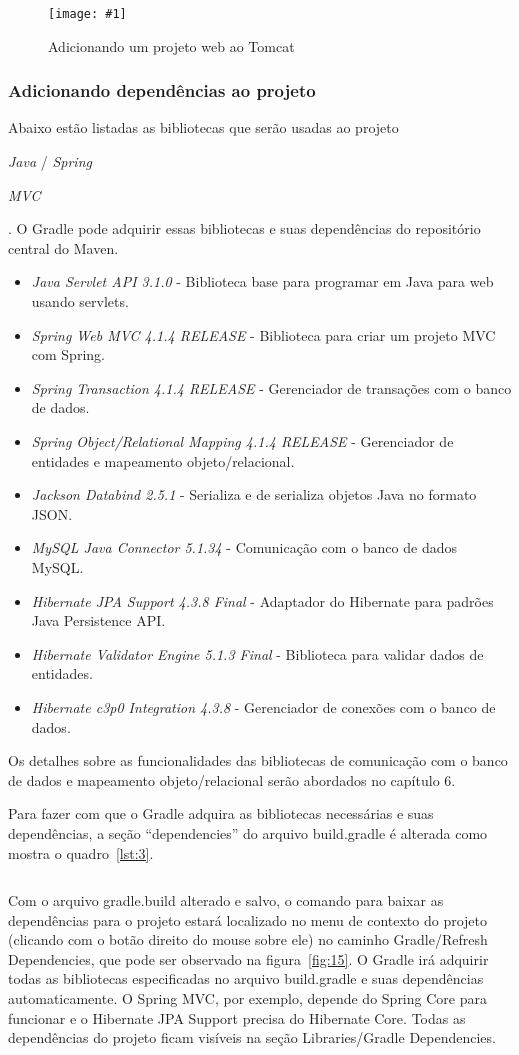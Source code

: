 \documentclass[a4paper,12pt]{article}
\newenvironment{simple}%
{\noindent}%
{\par\noindent}
\newcommand{\spring} {
	\lang{Java}/\est{Spring} \sigla{MVC}
}
\newcommand{\figura}[3] {
	\begin{figure}[H]
		\centering
		\texttt{[image: \#1]}
		\caption{#2}
		\label{#3}
	\end{figure}
	\FloatBarrier
}
\newcommand{\est}[1] {
	\textit{#1}
}
\newcommand{\sigla}[1] {
	\textit{#1}
}
\newcommand{\lang}[1] {
	\textit{#1}
}
\newcommand{\lib}[1] {
	\textit{#1}
}
\newcommand{\groovycode}[3] {
	\begin{simple}
	\inputminted[fontsize=\footnotesize]{groovy}{#1}
	\captionof{listing}{#2}
	\label{#3}
	\end{simple}
	\FloatBarrier
}
\begin{document}
\figura{tomcatproject.png}{Adicionando um projeto web ao Tomcat}{fig:14}

\subsubsection{Adicionando dependências ao projeto}

Abaixo estão listadas as bibliotecas que serão usadas ao projeto \spring. O Gradle pode adquirir essas bibliotecas e suas dependências do repositório central do Maven.

\begin{itemize}
  \item \lib{Java Servlet API 3.1.0} - Biblioteca base para programar em Java para web usando servlets.
  \item \lib{Spring Web MVC 4.1.4 RELEASE} - Biblioteca para criar um projeto MVC com Spring.
  \item \lib{Spring Transaction 4.1.4 RELEASE} - Gerenciador de transações com o banco de dados.
  \item \lib{Spring Object/Relational Mapping 4.1.4 RELEASE} - Gerenciador de entidades e mapeamento objeto/relacional.
  \item \lib{Jackson Databind 2.5.1} - Serializa e de serializa objetos Java no formato JSON.
  \item \lib{MySQL Java Connector 5.1.34} - Comunicação com o banco de dados MySQL.
  \item \lib{Hibernate JPA Support 4.3.8 Final} - Adaptador do Hibernate para padrões Java Persistence API.
  \item \lib{Hibernate Validator Engine 5.1.3 Final} - Biblioteca para validar dados de entidades.
  \item \lib{Hibernate c3p0 Integration 4.3.8} - Gerenciador de conexões com o banco de dados.
\end{itemize}

Os detalhes sobre as funcionalidades das bibliotecas de comunicação com o banco de dados e mapeamento objeto/relacional serão abordados no capítulo 6. 

Para fazer com que o Gradle adquira as bibliotecas necessárias e suas dependências, a seção “dependencies” do arquivo build.gradle é alterada como mostra o quadro~\ref{lst:3}.

\groovycode{code/gradledependencies.txt}{Adicionando dependências ao projeto}{lst:3}

Com o arquivo gradle.build alterado e salvo, o comando para baixar as dependências para o projeto estará localizado no menu de contexto do projeto (clicando com o botão direito do mouse sobre ele) no caminho Gradle/Refresh Dependencies, que pode ser observado na figura~\ref{fig:15}. O Gradle irá adquirir todas as bibliotecas especificadas no arquivo build.gradle e suas dependências automaticamente. O Spring MVC, por exemplo, depende do Spring Core para funcionar e o Hibernate JPA Support precisa do Hibernate Core. Todas as dependências do projeto ficam visíveis na seção Libraries/Gradle Dependencies.
\end{document}
